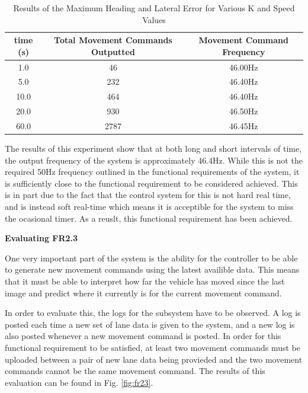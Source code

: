 \documentclass[titlepage,draft]{article}
\begin{document}
{\begin{table}
	\centering
	\begin{tabular}{| c | c | c |}
		\hline
		time (s) & Total Movement Commands Outputted & Movement Command Frequency \\ [0.5ex]
		\hline
		1.0      & 46                                & 46.00Hz                    \\
		\hline
		5.0      & 232                               & 46.40Hz                    \\
		\hline
		10.0     & 464                               & 46.40Hz                    \\
		\hline
		20.0     & 930                               & 46.50Hz                    \\
		\hline
		60.0     & 2787                              & 46.45Hz                    \\
		\hline
	\end{tabular}
	\caption{Results of the Maximum Heading and Lateral Error for Various K and Speed Values}
	\label{tab:frequency}
\end{table}


The results of this experiment show that at both long and short intervals of time, the output frequency of the system is approximately 46.4Hz. While this is not the required 50Hz frequency outlined in the functional requirements of the system, it is sufficiently close to the functional requirement to be considered achieved. This is in part due to the fact that the control system for this is not hard real time, and is instead soft real-time which means it is acceptible for the system to miss the ocasional timer. As a reuslt, this functional requirement has been achieved.

\textbf{Evaluating FR2.3}

One very important part of the system is the ability for the controller to be able to generate new movement commands using the latest availible data. This means that it must be able to interpret how far the vehicle has moved since the last image and predict where it currently is for the current movement command.

In order to evaluate this, the logs for the subsystem have to be observed. A log is posted each time a new set of lane data is given to the system, and a new log is also posted whenever a new movement command is posted. In order for this functional requirement to be satisfied, at least two movement commands must be uploaded between a pair of new lane data being provieded and the two movement commands cannot be the same movement command. The results of this evaluation can be found in Fig. \ref{fig:fr23}.

}
\end{document}
